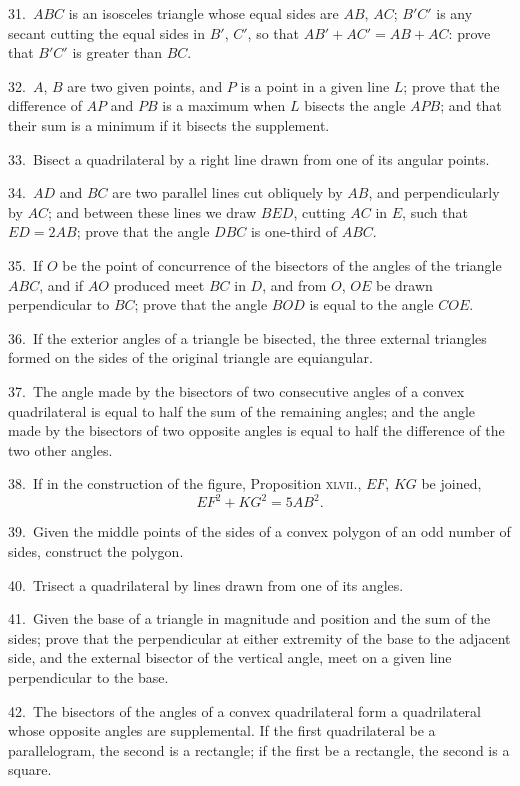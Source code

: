 \documentclass[oneside]{book}
\begin{document}
\begin{footnotesize}
31.~$ABC$ is an isosceles triangle whose equal sides are $AB$, $AC$;
$B'C'$ is any secant cutting the equal sides in $B'$, $C'$, so that
$AB' + AC' = AB + AC$: prove that $B'C'$ is greater than $BC$.

32.~$A$, $B$ are two given points, and $P$ is a point in a given line
$L$; prove that the difference of $AP$ and $PB$ is a maximum when
$L$ bisects the angle $APB$; and that their sum is a minimum if it
bisects the supplement.


33.~Bisect a quadrilateral by a right line drawn from one of
its angular points.

34.~$AD$ and $BC$ are two parallel lines cut obliquely by $AB$, and
perpendicularly by $AC$; and between these lines we draw $BED$,
cutting $AC$ in $E$, such that $ED = 2AB$; prove that the angle $DBC$
is one-third of $ABC$.

35.~If $O$ be the point of concurrence of the bisectors of the
angles of the triangle $ABC$, and if $AO$ produced meet $BC$ in $D$,
and from $O$, $OE$ be drawn perpendicular to $BC$; prove that the
angle $BOD$ is equal to the angle $COE$.

36.~If the exterior angles of a triangle be bisected, the three
external triangles formed on the sides of the original triangle are
equiangular.

37.~The angle made by the bisectors of two consecutive angles
of a convex quadrilateral is equal to half the sum of the
remaining angles; and the angle made by the bisectors of two opposite
angles is equal to half the difference of the two other angles.

38.~If in the construction of the figure, Proposition \textsc{xlvii.},
$EF$, $KG$ be joined,
\[
EF^2 + KG^2 = 5AB^2.
\]

39.~Given the middle points of the sides of a convex polygon
of an odd number of sides, construct the polygon.

40.~Trisect a quadrilateral by lines drawn from one of its
angles.

41.~Given the base of a triangle in magnitude and position and
the sum of the sides; prove that the perpendicular at either extremity
of the base to the adjacent side, and the external bisector
of the vertical angle, meet on a given line perpendicular to the
base.

42.~The bisectors of the angles of a convex quadrilateral form
a quadrilateral whose opposite angles are supplemental. If the
first quadrilateral be a parallelogram, the second is a rectangle;
if the first be a rectangle, the second is a square.


\end{footnotesize}
\end{document}
